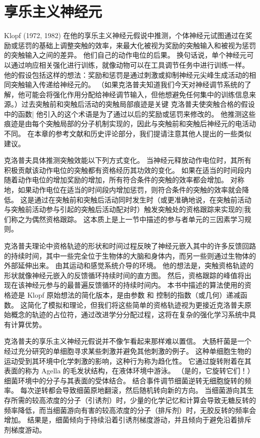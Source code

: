 \section{享乐主义神经元}


Klopf (1972, 1982) 在他的享乐主义神经元假说中推测，个体神经元试图通过在奖励或惩罚的基础上调整突触的效率，来最大化被视为奖励的突触输入和被视为惩罚的突触输入之间的差异。
他们自己的动作电位的后果。
换句话说，单个神经元可以通过响应相关强化进行训练，就像动物可以在工具调节任务中进行训练一样。
他的假设包括这样的想法：奖励和惩罚是通过刺激或抑制神经元尖峰生成活动的相同突触输入传递给神经元的。
（如果克洛普夫知道我们今天对神经调节系统的了解，他可能会将强化作用分配给神经调节输入，但他想避免任何集中的训练信息来源。）过去突触前和突触后活动的突触局部痕迹是关键 克洛普夫使突触合格的假设中的函数| 他引入的这个术语是为了通过以后的奖励或惩罚来修改的。
他推测这些痕迹是由每个突触局部的分子机制实现的，因此与突触前和突触后神经元的电活动不同。
在本章的参考文献和历史评论部分，我们提请注意其他人提出的一些类似建议。


克洛普夫具体推测突触效能以下列方式变化。
当神经元释放动作电位时，其所有积极贡献该动作电位的突触都有资格经历其功效的变化。
如果在适当的时间段内随着动作电位的增加奖励的增加，所有符合条件的突触的效率都会增加。
对称地，如果动作电位在适当的时间段内增加惩罚，则符合条件的突触的效率就会降低。
这是通过在突触前和突触后活动同时发生时（或更准确地说，在突触前活动与突触前活动参与引起的突触后活动配对时）触发突触处的资格跟踪来实现的|我们称之为偶然资格跟踪。
这本质上是上一节中描述的参与者单元的三因素学习规则。


克洛普夫理论中资格轨迹的形状和时间过程反映了神经元嵌入其中的许多反馈回路的持续时间，其中一些完全位于生物体的大脑和身体内，而另一些则通过生物体的外部延伸出来。
由其运动和感觉系统介导的环境。 他的想法是，突触资格轨迹的形状就像神经元嵌入的反馈循环持续时间的直方图。
然后，资格跟踪的峰值将出现在该神经元参与的最普遍反馈循环的持续时间内。
本书中描述的算法使用的资格迹是 Klopf 原始想法的简化版本，是由参数 和 控制的指数（或几何）递减函数。
这简化了模拟和理论，但我们将这些简单的资格轨迹视为更接近克洛普夫原始概念的轨迹的占位符，通过改进学分分配过程，这将在复杂的强化学习系统中具有计算优势。


克洛普夫的享乐主义神经元假说并不像乍看起来那样难以置信。
大肠杆菌是一个经过充分研究的单细胞寻求某些刺激并避免其他刺激的例子。
这种单细胞生物的运动受到其环境中化学刺激的影响，这种行为称为趋化性。
它通过旋转附着在其表面的称为 Agella 的毛发状结构，在液体环境中游泳。 （是的，它旋转它们！）细菌环境中的分子与其表面的受体结合。
结合事件调节细菌逆转无细胞旋转的频率。
每次逆转都会导致细菌原地翻滚，然后随机转向新的方向。
当细菌游向其生存所需的较高浓度的分子（引诱剂）时，少量的化学记忆和计算会导致无糖反转的频率降低，而当细菌游向有害的较高浓度的分子（排斥剂）时，无胶反转的频率会增加。
结果是，细菌倾向于持续沿着引诱剂梯度游动，并且倾向于避免沿着排斥剂梯度游动。


